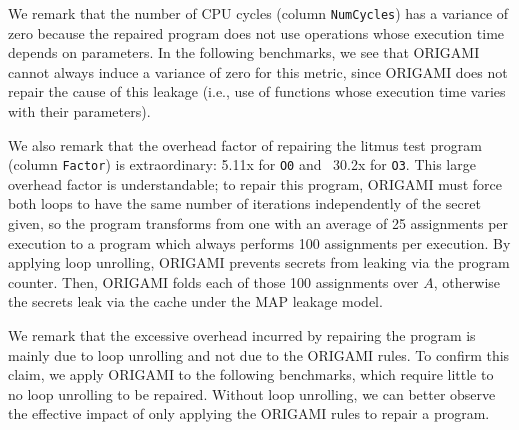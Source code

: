 We remark that the number of CPU cycles (column \texttt{NumCycles}) has a variance of zero because the repaired program does not use operations whose execution time depends on parameters. 
In the following benchmarks, we see that ORIGAMI cannot always induce a variance of zero for this metric, since ORIGAMI does not repair the cause of this leakage (i.e., use of functions whose execution time varies with their parameters).

We also remark that the overhead factor of repairing the litmus test program (column \texttt{Factor}) is extraordinary: 5.11x for \texttt{O0} and ~30.2x for \texttt{O3}. This large overhead factor is understandable; to repair this program, ORIGAMI must force both loops to have the same number of iterations independently of the secret given, so the program transforms from one with an average of 25 assignments per execution to a program which always performs 100 assignments per execution. By applying loop unrolling, ORIGAMI prevents secrets from leaking via the program counter. Then, ORIGAMI folds each of those 100 assignments over $A$, otherwise the secrets leak via the cache under the MAP leakage model. 

We remark that the excessive overhead incurred by repairing the program is mainly due to loop unrolling and not due to the ORIGAMI rules. To confirm this claim, we apply ORIGAMI to the following benchmarks, which require little to no loop unrolling to be repaired. Without loop unrolling, we can better observe the effective impact of only applying the ORIGAMI rules to repair a program.






